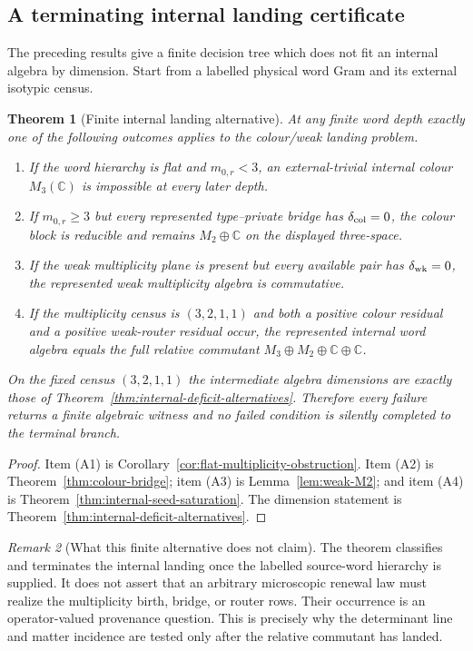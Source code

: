 \documentclass[11pt]{article}
\newtheorem{theorem}{Theorem}[section]
\theoremstyle{definition}
\theoremstyle{remark}
\newtheorem{remark}[theorem]{Remark}
\newcommand{\C}{\mathbb C}
\begin{document}
\subsection{A terminating internal landing certificate}

The preceding results give a finite decision tree which does not fit an
internal algebra by dimension.  Start from a labelled physical word Gram and
its external isotypic census.

\begin{theorem}[Finite internal landing alternative]
\label{thm:finite-internal-landing-alternative}
At any finite word depth exactly one of the following outcomes applies to the
colour/weak landing problem.
\begin{enumerate}[label=\textup{(A\arabic*)},leftmargin=3em]
\item If the word hierarchy is flat and $m_{0,r}<3$, an external-trivial
      internal colour $M_3(\C)$ is impossible at every later depth.
\item If $m_{0,r}\ge3$ but every represented type--private bridge has
      $\delta_{\rm col}=0$, the colour block is reducible and remains
      $M_2\oplus\C$ on the displayed three-space.
\item If the weak multiplicity plane is present but every available pair has
      $\delta_{\rm wk}=0$, the represented weak multiplicity algebra is
      commutative.
\item If the multiplicity census is $(3,2,1,1)$ and both a positive colour
      residual and a positive weak-router residual occur, the represented
      internal word algebra equals the full relative commutant
      $M_3\oplus M_2\oplus\C\oplus\C$.
\end{enumerate}
On the fixed census $(3,2,1,1)$ the intermediate algebra dimensions are
exactly those of Theorem~\ref{thm:internal-deficit-alternatives}.  Therefore
every failure returns a finite algebraic witness and no failed condition is
silently completed to the terminal branch.
\end{theorem}

\begin{proof}
Item (A1) is Corollary~\ref{cor:flat-multiplicity-obstruction}.  Item (A2) is
Theorem~\ref{thm:colour-bridge}; item (A3) is
Lemma~\ref{lem:weak-M2}; and item (A4) is
Theorem~\ref{thm:internal-seed-saturation}.  The dimension statement is
Theorem~\ref{thm:internal-deficit-alternatives}.
\end{proof}

\begin{remark}[What this finite alternative does not claim]
The theorem classifies and terminates the internal landing once the labelled
source-word hierarchy is supplied.  It does not assert that an arbitrary
microscopic renewal law must realize the multiplicity birth, bridge, or router
rows.  Their occurrence is an operator-valued provenance question.  This is
precisely why the determinant line and matter incidence are tested only after
the relative commutant has landed.
\end{remark}
\end{document}
